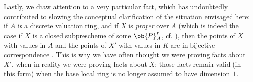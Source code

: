 \begin{env}[3.7.3]
\label{I.3.7.3}
Lastly, we draw attention to a very particular fact, which has undoubtedly contributed to slowing the conceptual clarification of the situation envisaged here: if $A$ is a discrete valuation ring, and if $X$ is \emph{proper} over $A$ (which is indeed the case if $X$ is a closed subprescheme of some $\bb{P}_A^r$, cf. ), then the points of $X$ with values in $A$ and the points of $X'$ with values in $K$ are in bijective correspondence .
This is why we have often thought we were proving facts about $X'$, when in reality we were proving facts about $X$; those facts remain valid (in this form) when the base local ring is no longer assumed to have dimension~$1$.
\end{env}
